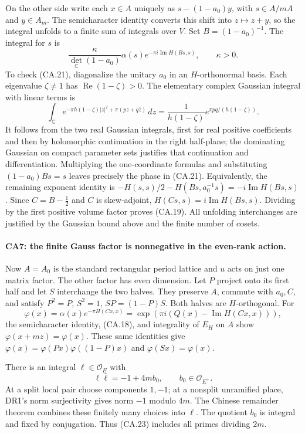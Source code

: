 On the other side write each $x\in A$ uniquely as
$s-(1-a_0)y$, with $s\in A/mA$ and $y\in A_m$.
The semicharacter identity converts this shift into $z\mapsto z+y$,
so the integral unfolds to a finite sum of integrals over $V$.
Set $B=(1-a_0)^{-1}$. The integral for $s$ is
\[
 \frac{\kappa}{\det_{\mathbb C}(1-a_0)}
       \alpha(s)e^{-\pi i\operatorname{Im}H(Bs,s)},\qquad \kappa>0.
 \tag{CA.21}
\]
To check (CA.21), diagonalize the unitary $a_0$ in an $H$-orthonormal
basis. Each eigenvalue $\zeta\ne1$ has $\operatorname{Re}(1-\zeta)>0$.
The elementary complex Gaussian integral with linear terms is
\[
 \int_{\mathbb C}e^{-\pi h(1-\zeta)|z|^2+\pi(pz+q\bar z)}\,dz
   =\frac1{h(1-\zeta)}
      e^{\pi pq/(h(1-\zeta))}.
\]
It follows from the two real Gaussian integrals, first for real
positive coefficients and then by holomorphic continuation in the
right half-plane; the dominating Gaussian on compact parameter
sets justifies that continuation and differentiation. Multiplying
the one-coordinate formulas and substituting
$(1-a_0)Bs=s$ leaves precisely the phase in (CA.21).
Equivalently, the remaining exponent identity is
$-H(s,s)/2-H(Bs,a_0^{-1}s)=-i\operatorname{Im}H(Bs,s)$.
Since $C=B-\tfrac12$ and $C$ is skew-adjoint,
$H(Cs,s)=i\operatorname{Im}H(Bs,s)$. Dividing by the first
positive volume factor proves (CA.19). All unfolding interchanges
are justified by the Gaussian bound above and the finite number
of cosets.

\paragraph{CA7: the finite Gauss factor is nonnegative in the even-rank action.}
Now $A=A_0$ is the standard rectangular period lattice and $u$
acts on just one matrix factor. The other factor has even dimension.
Let $P$ project onto its first half and let $S$ interchange the two
halves. They preserve $A$, commute with $a_0,C$, and satisfy
$P^2=P$, $S^2=1$, $SP=(1-P)S$. Both halves are $H$-orthogonal.
For
\[
 \varphi(x)=\alpha(x)e^{-\pi H(Cx,x)}
           =\exp\!\left(\pi i\left(Q(x)-\operatorname{Im}H(Cx,x)\right)\right),
 \tag{CA.22}
\]
the semicharacter identity, (CA.18), and integrality of $E_H$ on
$A$ show $\varphi(x+mz)=\varphi(x)$. These same identities give
$\varphi(x)=\varphi(Px)\varphi((1-P)x)$ and
$\varphi(Sx)=\varphi(x)$.

There is an integral $\ell\in\mathcal O_E$ with
\[
 \ell\bar\ell=-1+4m b_0,\qquad b_0\in\mathcal O_{E^+}.
 \tag{CA.23}
\]
At a split local pair choose components $1,-1$; at a nonsplit
unramified place, DR1's norm surjectivity gives norm $-1$ modulo
$4m$. The Chinese remainder theorem combines these finitely many
choices into $\ell$. The quotient $b_0$ is integral and fixed by
conjugation. Thus (CA.23) includes all primes dividing $2m$.

